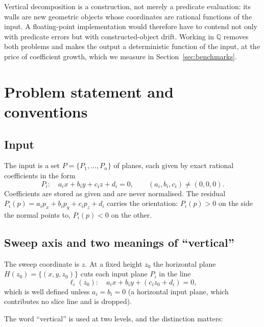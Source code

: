 \documentclass[11pt]{article}
\begin{document}
Vertical decomposition is a construction, not merely a predicate evaluation:
its walls are new geometric objects whose coordinates are rational functions of
the input.  A floating-point implementation would therefore have to contend not
only with predicate errors but with constructed-object drift.  Working in
$\mathbb{Q}$ removes both problems and makes the output a deterministic
function of the input, at the price of coefficient growth, which we measure in
Section~\ref{sec:benchmarks}.

\section{Problem statement and conventions}
\label{sec:problem}

\subsection{Input}

The input is a set $P = \{P_1,\dots,P_n\}$ of planes, each given by exact
rational coefficients in the form
\[
  P_i:\quad a_i x + b_i y + c_i z + d_i = 0,
  \qquad (a_i,b_i,c_i) \neq (0,0,0).
\]
Coefficients are stored as given and are never normalised.  The residual
$P_i(p) = a_i p_x + b_i p_y + c_i p_z + d_i$ carries the orientation: $P_i(p) >
0$ on the side the normal points to, $P_i(p) < 0$ on the other.

\subsection{Sweep axis and two meanings of ``vertical''}

The sweep coordinate is $z$.  At a fixed height $z_0$ the horizontal plane
$H(z_0) = \{(x,y,z_0)\}$ cuts each input plane $P_i$ in the line
\begin{equation}
  \ell_i(z_0):\quad a_i x + b_i y + (c_i z_0 + d_i) = 0 ,
  \label{eq:slice}
\end{equation}
which is well defined unless $a_i = b_i = 0$ (a horizontal input plane, which
contributes no slice line and is dropped).

The word ``vertical'' is used at two levels, and the distinction matters:
\end{document}
